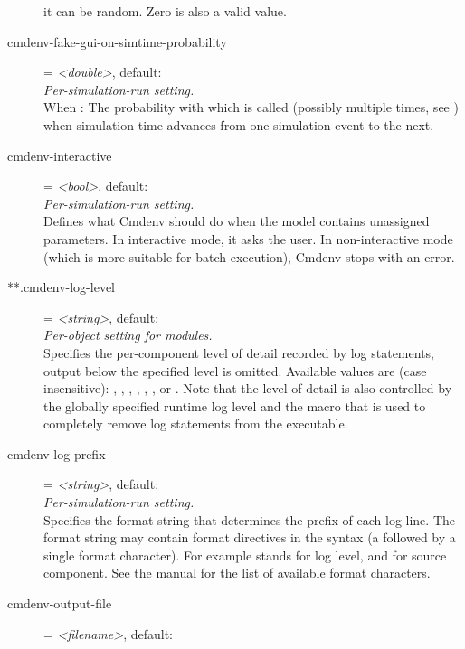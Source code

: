 \begin{description}
    it can be random. Zero is also a valid value.
\item[cmdenv-fake-gui-on-simtime-probability] = \textit{<double>}, default: \\
    \textit{Per-simulation-run setting.}\\
    When : The
    probability with which  is called (possibly
    multiple times, see
    )
    when simulation time advances from one simulation event to the next.
\item[cmdenv-interactive] = \textit{<bool>}, default: \\
    \textit{Per-simulation-run setting.}\\
    Defines what Cmdenv should do when the model contains unassigned
    parameters. In interactive mode, it asks the user. In non-interactive mode
    (which is more suitable for batch execution), Cmdenv stops with an error.
\item[**.cmdenv-log-level] = \textit{<string>}, default: \\
    \textit{Per-object setting for modules.}\\
    Specifies the per-component level of detail recorded by log statements,
    output below the specified level is omitted. Available values are (case
    insensitive): , , , , ,
    ,  or . Note that the level of detail is
    also controlled by the globally specified runtime log level and the
     macro that is used to completely remove log
    statements from the executable.
\item[cmdenv-log-prefix] = \textit{<string>}, default: \ttt{[\%l]	}\\
    \textit{Per-simulation-run setting.}\\
    Specifies the format string that determines the prefix of each log line.
    The format string may contain format directives in the syntax  (a
    \ttt{\%} followed by a single format character).  For example 
    stands for log level, and  for source component. See the manual
    for the list of available format characters.
\item[cmdenv-output-file] = \textit{<filename>}, default: \\

\end{description}
